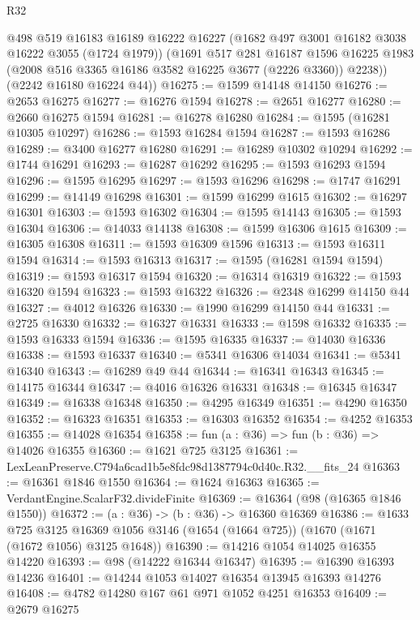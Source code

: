 \begin{lexlean}{R32}
\begin{coremodule}
        @498
        @519
        @16183
        @16189
        @16222
        @16227
        (@1682 @497 @3001 @16182 @3038 @16222 @3055 (@1724 @1979))
        (@1691
          @517
          @281
          @16187
          @1596
          @16225
          @1983
          (@2008 @516 @3365 @16186 @3582 @16225 @3677 (@2226 @3360))
          @2238))
      (@2242 @16180 @16224 @44))
@16275 := @1599 @14148 @14150
@16276 := @2653 @16275
@16277 := @16276 @1594
@16278 := @2651 @16277
@16280 := @2660 @16275 @1594
@16281 := @16278 @16280
@16284 := @1595 (@16281 @10305 @10297)
@16286 := @1593 @16284 @1594
@16287 := @1593 @16286
@16289 := @3400 @16277 @16280
@16291 := @16289 @10302 @10294
@16292 := @1744 @16291
@16293 := @16287 @16292
@16295 := @1593 @16293 @1594
@16296 := @1595 @16295
@16297 := @1593 @16296
@16298 := @1747 @16291
@16299 := @14149 @16298
@16301 := @1599 @16299 @1615
@16302 := @16297 @16301
@16303 := @1593 @16302
@16304 := @1595 @14143
@16305 := @1593 @16304
@16306 := @14033 @14138
@16308 := @1599 @16306 @1615
@16309 := @16305 @16308
@16311 := @1593 @16309 @1596
@16313 := @1593 @16311 @1594
@16314 := @1593 @16313
@16317 := @1595 (@16281 @1594 @1594)
@16319 := @1593 @16317 @1594
@16320 := @16314 @16319
@16322 := @1593 @16320 @1594
@16323 := @1593 @16322
@16326 := @2348 @16299 @14150 @44
@16327 := @4012 @16326
@16330 := @1990 @16299 @14150 @44
@16331 := @2725 @16330
@16332 := @16327 @16331
@16333 := @1598 @16332
@16335 := @1593 @16333 @1594
@16336 := @1595 @16335
@16337 := @14030 @16336
@16338 := @1593 @16337
@16340 := @5341 @16306 @14034
@16341 := @5341 @16340
@16343 := @16289 @49 @44
@16344 := @16341 @16343
@16345 := @14175 @16344
@16347 := @4016 @16326 @16331
@16348 := @16345 @16347
@16349 := @16338 @16348
@16350 := @4295 @16349
@16351 := @4290 @16350
@16352 := @16323 @16351
@16353 := @16303 @16352
@16354 := @4252 @16353
@16355 := @14028 @16354
@16358 := fun (a : @36) => fun (b : @36) => @14026 @16355
@16360 := @1621 @725 @3125
@16361 := LexLeanPreserve.C794a6cad1b5e8fdc98d1387794c0d40c.R32.__fits_24
@16363 := @16361 @1846 @1550
@16364 := @1624 @16363
@16365 := VerdantEngine.ScalarF32.divideFinite
@16369 := @16364 (@98 (@16365 @1846 @1550))
@16372 := (a : @36) -> (b : @36) -> @16360 @16369
@16386 := @1633
    @725
    @3125
    @16369
    @1056
    @3146
    (@1654 (@1664 @725))
    (@1670 (@1671 (@1672 @1056) @3125 @1648))
@16390 := @14216 @1054 @14025 @16355 @14220
@16393 := @98 (@14222 @16344 @16347)
@16395 := @16390 @16393 @14236
@16401 := @14244 @1053 @14027 @16354 @13945 @16393 @14276
@16408 := @4782 @14280 @167 @61 @971 @1052 @4251 @16353
@16409 := @2679 @16275

\end{coremodule}
\end{lexlean}
